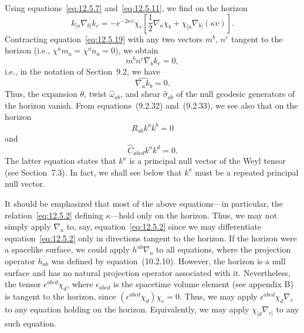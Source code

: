 Using equations~\eqref{eq:12.5.7} and~\eqref{eq:12.5.11}, we find on the horizon
\begin{equation}
 k_{[a}\nabla_{b]}k_c=-e^{-2\kappa v}\chi_c
 \left[\frac12\nabla_a\chi_b+\chi_{[a}\nabla_{b]}(\kappa v)\right] .
 \tag{12.5.19}\label{eq:12.5.19}
\end{equation}
Contracting equation~\eqref{eq:12.5.19} with any two vectors \(m^b\), \(n^c\)
tangent to the horizon (i.e., \(\chi^am_a=\chi^an_a=0\)), we obtain
\begin{equation}
 m^bn^c\nabla_bk_c=0 ,
 \tag{12.5.20}\label{eq:12.5.20}
\end{equation}
i.e., in the notation of Section~9.2, we have
\begin{equation}
 \widehat{\nabla_a k_b}=0 .
 \tag{12.5.21}\label{eq:12.5.21}
\end{equation}
Thus, the expansion \(\theta\), twist \(\widehat{\omega}_{ab}\), and shear
\(\widehat{\sigma}_{ab}\) of the null geodesic generators of the horizon vanish.
From equations~(9.2.32) and~(9.2.33), we see also that on the horizon
\begin{equation}
 R_{ab}k^ak^b=0
 \tag{12.5.22}\label{eq:12.5.22}
\end{equation}
and
\begin{equation}
 \widehat{C}_{abcd}k^ak^d=0 .
 \tag{12.5.23}\label{eq:12.5.23}
\end{equation}
The latter equation states that \(k^a\) is a principal null vector of the Weyl tensor
(see Section~7.3). In fact, we shall see below that \(k^a\) must be a repeated
principal null vector.

It should be emphasized that most of the above equations---in particular, the
relation~\eqref{eq:12.5.2} defining \(\kappa\)---hold only on the horizon. Thus, we
may not simply apply \(\nabla_a\) to, say, equation~\eqref{eq:12.5.2} since we may
differentiate equation~\eqref{eq:12.5.2} only in directions tangent to the horizon. If
the horizon were a spacelike surface, we could apply \(h^{ab}\nabla_a\) to all
equations, where the projection operator \(h_{ab}\) was defined by equation~(10.2.10).
However, the horizon is a null surface and has no natural projection operator
associated with it. Nevertheless, the tensor \(\epsilon^{abcd}\chi_d\), where
\(\epsilon_{abcd}\) is the spacetime volume element (see appendix B) is tangent to
the horizon, since \((\epsilon^{abcd}\chi_d)\chi_c=0\). Thus, we may apply
\(\epsilon^{abcd}\chi_d\nabla_c\) to any equation holding on the horizon.
Equivalently, we may apply \(\chi_{[d}\nabla_{c]}\) to any such equation.

